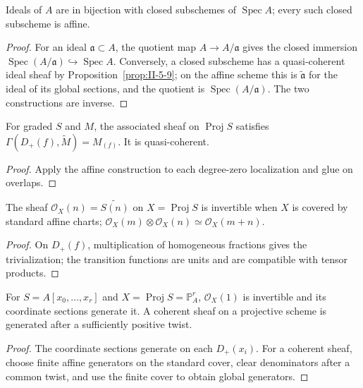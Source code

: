 \begin{corollary}
\label{cor:II-5-10}
Ideals of $A$ are in bijection with closed subschemes of $\operatorname{Spec}A$; every such closed subscheme
is affine.
\end{corollary}
\begin{proof}
For an ideal $\mathfrak a\subset A$, the quotient map $A\to A/\mathfrak a$ gives the closed immersion
$\operatorname{Spec}(A/\mathfrak a)\hookrightarrow\operatorname{Spec}A$.  Conversely, a closed subscheme
has a quasi-coherent ideal sheaf by Proposition~\ref{prop:II-5-9}; on the affine scheme this is
$\widetilde{\mathfrak a}$ for the ideal of its global sections, and the quotient is
$\operatorname{Spec}(A/\mathfrak a)$.  The two constructions are inverse.
\end{proof}

\begin{proposition}
\label{prop:II-5-11}
For graded $S$ and $M$, the associated sheaf on $\operatorname{Proj}S$ satisfies
$\Gamma(D_+(f),\widetilde M)=M_{(f)}$. It is quasi-coherent.
\end{proposition}
\begin{proof}
Apply the affine construction to each degree-zero localization and glue on overlaps.
\end{proof}

\begin{proposition}
\label{prop:II-5-12}
The sheaf $\mathcal O_X(n)=\widetilde{S(n)}$ on $X=\operatorname{Proj}S$ is invertible when $X$ is
covered by standard affine charts; $\mathcal O_X(m)\otimes\mathcal O_X(n)\simeq\mathcal O_X(m+n)$.
\end{proposition}
\begin{proof}
On $D_+(f)$, multiplication of homogeneous fractions gives the trivialization; the transition functions
are units and are compatible with tensor products.
\end{proof}

\begin{proposition}
\label{prop:II-5-13}
For $S=A[x_0,\ldots,x_r]$ and $X=\operatorname{Proj}S=\mathbb P^r_A$, $\mathcal O_X(1)$ is invertible and
its coordinate sections generate it. A coherent sheaf on a projective scheme is generated after a
sufficiently positive twist.
\end{proposition}
\begin{proof}
The coordinate sections generate on each $D_+(x_i)$. For a coherent sheaf, choose finite affine
generators on the standard cover, clear denominators after a common twist, and use the finite cover
to obtain global generators.
\end{proof}


